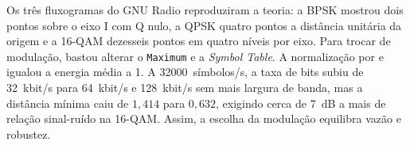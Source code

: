 \begin{singlespace}
\noindent\hspace{1.25cm}Os três fluxogramas do GNU Radio reproduziram a teoria: a BPSK mostrou dois pontos sobre o eixo I com Q nulo, a QPSK quatro pontos a distância unitária da origem e a 16-QAM dezesseis pontos em quatro níveis por eixo. Para trocar de modulação, bastou alterar o \texttt{Maximum} e a \textit{Symbol Table}. A normalização por  e  igualou a energia média a 1. A \num{32000}~símbolos/s, a taxa de bits subiu de \SI{32}{kbit/s} para \SI{64}{kbit/s} e \SI{128}{kbit/s} sem mais largura de banda, mas a distância mínima caiu de $1{,}414$ para $0{,}632$, exigindo cerca de \SI{7}{dB} a mais de relação sinal-ruído na 16-QAM. Assim, a escolha da modulação equilibra vazão e robustez.
\end{singlespace}
